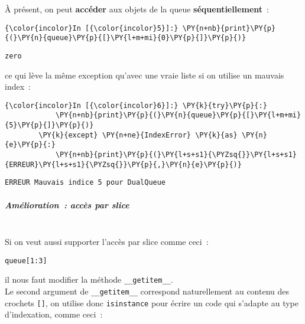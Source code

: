     À présent, on peut \textbf{accéder} aux objets de la queue
\textbf{séquentiellement}~:

    \begin{Verbatim}[commandchars=\\\{\}]
{\color{incolor}In [{\color{incolor}5}]:} \PY{n+nb}{print}\PY{p}{(}\PY{n}{queue}\PY{p}{[}\PY{l+m+mi}{0}\PY{p}{]}\PY{p}{)}
\end{Verbatim}


    \begin{Verbatim}[commandchars=\\\{\}]
zero

    \end{Verbatim}

    ce qui lève la même exception qu'avec une vraie liste si on utilise un
mauvais index~:

    \begin{Verbatim}[commandchars=\\\{\}]
{\color{incolor}In [{\color{incolor}6}]:} \PY{k}{try}\PY{p}{:}
            \PY{n+nb}{print}\PY{p}{(}\PY{n}{queue}\PY{p}{[}\PY{l+m+mi}{5}\PY{p}{]}\PY{p}{)}
        \PY{k}{except} \PY{n+ne}{IndexError} \PY{k}{as} \PY{n}{e}\PY{p}{:}
            \PY{n+nb}{print}\PY{p}{(}\PY{l+s+s1}{\PYZsq{}}\PY{l+s+s1}{ERREUR}\PY{l+s+s1}{\PYZsq{}}\PY{p}{,}\PY{n}{e}\PY{p}{)}
\end{Verbatim}


    \begin{Verbatim}[commandchars=\\\{\}]
ERREUR Mauvais indice 5 pour DualQueue

    \end{Verbatim}

    \hypertarget{amuxe9lioration-accuxe8s-par-slice}{%
\subparagraph{Amélioration~: accès par
slice\\\\}\label{amuxe9lioration-accuxe8s-par-slice}}

    Si on veut aussi supporter l'accès par slice comme ceci~:

\begin{verbatim}
queue[1:3]
\end{verbatim}

il nous faut modifier la méthode \texttt{\_\_getitem\_\_}.\\

    Le second argument de \texttt{\_\_getitem\_\_} correspond naturellement
au contenu des crochets \texttt{{[}{]}}, on utilise donc
\texttt{isinstance} pour écrire un code qui s'adapte au type
d'indexation, comme ceci~:

